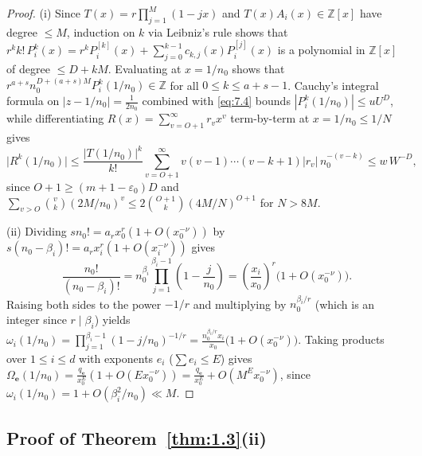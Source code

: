 \documentclass[11pt,reqno]{amsart}
\theoremstyle{remark}
\numberwithin{equation}{section}
\newcommand{\Z}{\mathbb{Z}}
\begin{document}
\begin{proof}
(i) Since $T(x) = r\prod_{j=1}^M (1 - jx)$ and $T(x)A_i(x) \in \Z[x]$ have degree $\le M$, induction on $k$ via Leibniz's rule shows that $r^k k!\,P_i^k(x) = r^k P_i^{[k]}(x) + \sum_{j=0}^{k-1} c_{k,j}(x) P_i^{[j]}(x)$ is a polynomial in $\Z[x]$ of degree $\le D + kM$. Evaluating at $x = 1/n_0$ shows that $r^{a+s} n_0^{D+(a+s)M} P_i^k(1/n_0) \in \Z$ for all $0 \le k \le a + s - 1$. Cauchy's integral formula on $|z - 1/n_0| = \frac{1}{2n_0}$ combined with \eqref{eq:7.4} bounds $|P_i^k(1/n_0)| \le uU^D$, while differentiating $R(x) = \sum_{v=O+1}^\infty r_v x^v$ term-by-term at $x = 1/n_0 \le 1/N$ gives
\[
\bigl|R^k(1/n_0)\bigr| \le \frac{|T(1/n_0)|^k}{k!} \sum_{v=O+1}^\infty v(v - 1)\cdots(v - k + 1)|r_v|\,n_0^{-(v-k)} \le w\,W^{-D},
\]
since $O + 1 \ge (m + 1 - \varepsilon_0)D$ and $\sum_{v > O} \binom{v}{k}(2M/n_0)^v \le 2\binom{O+1}{k}(4M/N)^{O+1}$ for $N > 8M$.

(ii) Dividing $sn_0! = a_r x_0^r(1 + O(x_0^{-\nu}))$ by $s(n_0 - \beta_i)! = a_r x_i^r(1 + O(x_i^{-\nu}))$ gives
\[
\frac{n_0!}{(n_0 - \beta_i)!} = n_0^{\beta_i} \prod_{j=1}^{\beta_i-1} \left(1 - \frac{j}{n_0}\right) = \left(\frac{x_i}{x_0}\right)^r \bigl(1 + O(x_0^{-\nu})\bigr).
\]
Raising both sides to the power $-1/r$ and multiplying by $n_0^{\beta_i/r}$ (which is an integer since $r \mid \beta_i$) yields $\omega_i(1/n_0) = \prod_{j=1}^{\beta_i-1} (1 - j/n_0)^{-1/r} = \frac{n_0^{\beta_i/r} x_i}{x_0}\bigl(1 + O(x_0^{-\nu})\bigr)$. Taking products over $1 \le i \le d$ with exponents $e_i$ ($\sum e_i \le E$) gives $\Omega_{\mathbf{e}}(1/n_0) = \frac{q_{\mathbf{e}}}{x_0^E}(1 + O(Ex_0^{-\nu})) = \frac{q_{\mathbf{e}}}{x_0^E} + O(M^E x_0^{-\nu})$, since $\omega_i(1/n_0) = 1 + O(\beta_i^2/n_0) \ll M$.
\end{proof}

\subsection{Proof of Theorem~\ref{thm:1.3}(ii)}
\end{document}
